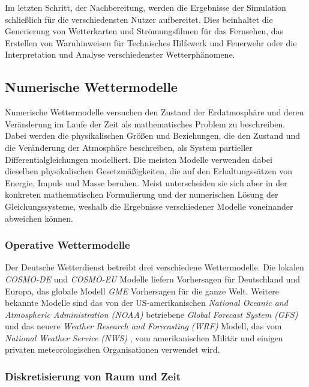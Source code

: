 Im letzten Schritt, der Nachbereitung, werden die Ergebnisse der
Simulation schließlich für die verschiedensten Nutzer
aufbereitet. Dies beinhaltet die Generierung von Wetterkarten und
Strömungsfilmen für das Fernsehen, das Erstellen von Warnhinweisen für
Technisches Hilfswerk und Feuerwehr oder die Interpretation und
Analyse verschiedenster Wetterphänomene.

\subsection{Numerische Wettermodelle}
Numerische Wettermodelle versuchen den Zustand der Erdatmosphäre und
deren Veränderung im Laufe der Zeit als mathematisches Problem zu
beschreiben. Dabei werden die physikalischen Größen und Beziehungen,
die den Zustand und die Veränderung der Atmosphäre beschreiben, als
System partieller Differentialgleichungen modelliert. Die meisten
Modelle verwenden dabei dieselben physikalischen Gesetzmäßigkeiten,
die auf den Erhaltungssätzen von Energie, Impuls und Masse
beruhen. Meist unterscheiden sie sich aber in der konkreten
mathematischen Formulierung und der numerischen Lösung der
Gleichungssysteme, weshalb die Ergebnisse verschiedener Modelle
voneinander abweichen können.

\subsubsection{Operative Wettermodelle}

Der Deutsche Wetterdienst betreibt drei verschiedene
Wettermodelle. Die lokalen \textit{COSMO-DE} und \textit{COSMO-EU}
Modelle liefern Vorhersagen für Deutschland und Europa, das globale
Modell \textit{GME} Vorhersagen für die ganze Welt. Weitere bekannte
Modelle sind das von der US-amerikanischen \textit{National Oceanic
  and Atmospheric Administration (NOAA)} betriebene \textit{Global
  Forecast System (GFS)} 
und das neuere \textit{Weather Research and Forecasting (WRF)}
 Modell, das vom
\textit{National Weather Service (NWS)} , vom amerikanischen Militär und einigen privaten
meteorologischen Organisationen verwendet wird.

\subsubsection{Diskretisierung von Raum und Zeit}

